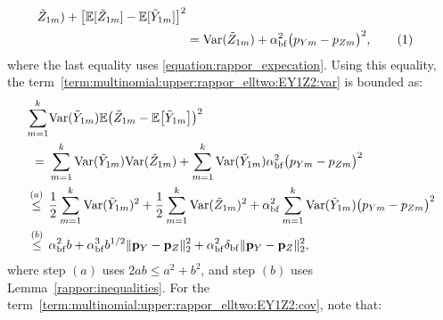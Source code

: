 \documentclass[twoside,11pt]{article}
\newcommand\numberthis{\addtocounter{equation}{1}\tag{\theequation}}
\newcommand{\rvTwo}{Y}
\newcommand{\rvThree}{Z}
\newcommand{\private}[1]{\tilde{#1}}
\newcommand{\mE}{\mathbb{E}} %
\newcommand{\normSqMultinomMax}{b}
\newcommand{\alphabetSize}{k} %
\newcommand{\vectorIndex}{m}
\newcommand{\probVecElement}[2]{p_{{#1}{#2}}}
\newcommand{\probVec}{\mathbf{p}} %
\newcommand{\privacyParameter}{\alpha} %
\newcommand{\privacyParameterrappor}{\privacyParameter_{\mathrm{bf}}}
\newcommand{\smallNumber}{\delta}
\newcommand{\smallNumberrappor}{\smallNumber_{\mathrm{bf}}}
\begin{document}
\begin{appendix}
\begin{itemize}
\begin{align*}
		\private{\rvThree}_{1 \vectorIndex}
		)
		+
		\bigl[
		\mE
		[
		\private{\rvThree}_{1 \vectorIndex}
		]
		-
		\mE
		[
		\private{\rvTwo}_{1 \vectorIndex}
		]
		\bigr]^2
		\\&=
		\mathrm{Var}(
		\private{\rvThree}_{1 \vectorIndex}
		)
		+
		\privacyParameterrappor ^2
		\bigl(  \probVecElement{\rvTwo}{\vectorIndex} - \probVecElement{\rvThree}{\vectorIndex}\bigr)^2,
		\numberthis
		\label{term:multinomial:upper:rappor_elltwo:EY1Z2:var:trick}
	\end{align*}
	where the last equality uses \eqref{equation:rappor_expecation}.
	Using this equality, the term~\eqref{term:multinomial:upper:rappor_elltwo:EY1Z2:var} is bounded as:
	\begin{align*}
		\sum_{\vectorIndex = 1}^\alphabetSize
		&
		\mathrm{Var}(\private{Y}_{1 \vectorIndex})
		\mE
		\bigl( %
		\private{\rvThree}_{1 \vectorIndex}
		-
		\mE
		\bigl[
		\private{\rvTwo}_{1 \vectorIndex}
		\bigr]
		\bigr)^2
		\\= ~ &
		\sum_{\vectorIndex = 1}^\alphabetSize
		\mathrm{Var}(\private{Y}_{1 \vectorIndex})
		\mathrm{Var}(
		\private{\rvThree}_{1 \vectorIndex}
		)
		+
		\sum_{\vectorIndex = 1}^\alphabetSize
		\mathrm{Var}(\private{Y}_{1 \vectorIndex})
		\privacyParameterrappor ^2
		\bigl(  \probVecElement{\rvTwo}{\vectorIndex} - \probVecElement{\rvThree}{\vectorIndex}\bigr)^2
		\\ \stackrel{(a)}{\leq} \hskip 1.57mm &
		\frac{1}{2}
		\sum_{\vectorIndex = 1}^\alphabetSize
		\mathrm{Var}(\private{Y}_{1 \vectorIndex})^2
		+
		\frac{1}{2}
		\sum_{\vectorIndex = 1}^\alphabetSize
		\mathrm{Var}(
		\private{\rvThree}_{1 \vectorIndex}
		)^2
		+
		\privacyParameterrappor ^2
		\sum_{\vectorIndex = 1}^\alphabetSize
		\mathrm{Var}(\private{Y}_{1 \vectorIndex})
		\bigl(  \probVecElement{\rvTwo}{\vectorIndex} - \probVecElement{\rvThree}{\vectorIndex}\bigr)^2
		\\ \stackrel{(b)}{\leq} \hskip 1.57mm &
		\privacyParameterrappor^2 \normSqMultinomMax
		+
		\privacyParameterrappor^3
		\normSqMultinomMax^{1/2}
		\|\probVec_{\rvTwo} - \probVec_{\rvThree}\|_2^2
		+
		\privacyParameterrappor^2
		\smallNumberrappor
		\|\probVec_{\rvTwo} - \probVec_{\rvThree}\|_2^2,
	\end{align*}
	where step $(a)$ uses $2ab \leq a^2 + b^2$, and step $(b)$ uses Lemma~\ref{rappor:inequalities}.
	For the term~\eqref{term:multinomial:upper:rappor_elltwo:EY1Z2:cov}, 
	note that:

\end{itemize}
\end{appendix}
\end{document}
